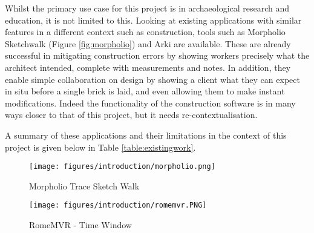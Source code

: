 \documentclass{article}
\begin{document}
Whilst the primary use case for this project is in archaeological research and education, it is not limited to this. Looking at existing applications with similar features in a different context such as construction, tools such as Morpholio Sketchwalk (Figure \ref{fig:morpholio}) and Arki are available. These are already successful in mitigating construction errors by showing workers precisely what the architect intended, complete with measurements and notes. In addition, they enable simple collaboration on design \cite{existing:ardesign} by showing a client what they can expect in situ before a single brick is laid, and even allowing them to make instant modifications. Indeed the functionality of the construction software is in many ways closer to that of this project, but it needs re-contextualisation.

A summary of these applications and their limitations in the context of this project is given below in Table \ref{table:existingwork}.

\begin{figure}[H]
\centering
\begin{minipage}{.5\textwidth}
  \centering
  \texttt{[image: figures/introduction/morpholio.png]}
  \caption{Morpholio Trace Sketch Walk \cite{existing:morpholio}}
  \label{fig:morpholio}
\end{minipage}%
\begin{minipage}{.5\textwidth}
  \centering
  \texttt{[image: figures/introduction/romemvr.PNG]}
  \caption{RomeMVR - Time Window \cite{existing:romemvr}}
  \label{fig:romemvr}
\end{minipage}
\end{figure}
\end{document}
